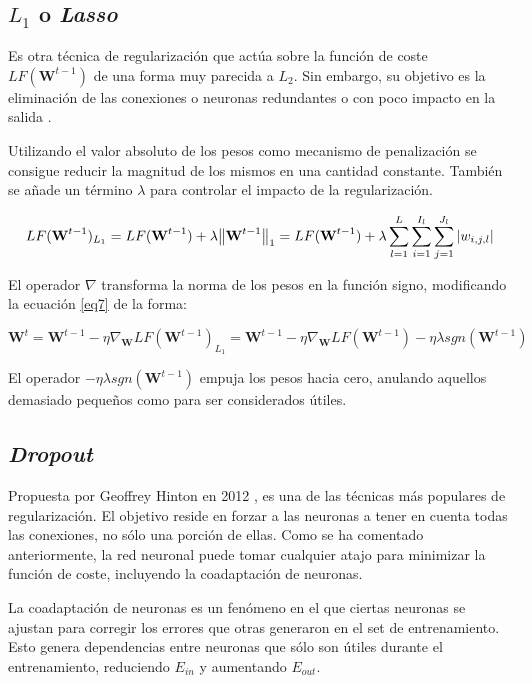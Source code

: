 \subsection{$L_1$ o \textit{Lasso}}
Es otra técnica de regularización que actúa sobre la función de coste $LF(\textbf{W}^{t-1})$  de una forma muy parecida a $L_2$. Sin embargo, su objetivo es la eliminación de las conexiones o neuronas redundantes o con poco impacto en la salida \cite{deeplearning}.

Utilizando el valor absoluto de los pesos como mecanismo de penalización se consigue reducir la magnitud de los mismos en una cantidad constante. También se añade un término $\lambda$ para controlar el impacto de la regularización.

\begin{equation}
	LF(\textbf{W}^{t-1})_{L_1} = LF(\textbf{W}^{t-1}) + \lambda \norm{\textbf{W}^{t-1}}_1 = LF(\textbf{W}^{t-1}) + \lambda \sum_{l=1}^{L}\sum_{i=1}^{I_l}\sum_{j=1}^{J_l}\abs{w_{i,j,l}}
\end{equation}

El operador $\nabla$ transforma la norma de los pesos en la función signo, modificando la ecuación \ref{eq7} de la forma:

\begin{equation}
	\textbf{W}^t=\textbf{W}^{t-1}-\eta \nabla_\textbf{W}LF(\textbf{W}^{t-1})_{L_1} = \textbf{W}^{t-1} - \eta \nabla_\textbf{W}LF(\textbf{W}^{t-1}) - \eta\lambda sgn( \textbf{W}^{t-1})
\end{equation}

El operador $- \eta\lambda sgn( \textbf{W}^{t-1})$ empuja los pesos hacia cero, anulando aquellos demasiado pequeños como para ser considerados útiles.


\subsection{\textit{Dropout}}
Propuesta por Geoffrey Hinton en 2012 \cite{dropout}, es una de las técnicas más populares de regularización. El objetivo reside en forzar a las neuronas a tener en cuenta todas las conexiones, no sólo una porción de ellas. Como se ha comentado anteriormente, la red neuronal puede tomar cualquier atajo para minimizar la función de coste, incluyendo la coadaptación de neuronas. 

La coadaptación de neuronas es un fenómeno en el que ciertas neuronas se ajustan para corregir los errores que otras generaron en el set de entrenamiento. Esto genera dependencias entre neuronas que sólo son útiles durante el entrenamiento, reduciendo $E_{in}$ y aumentando $E_{out}$.


